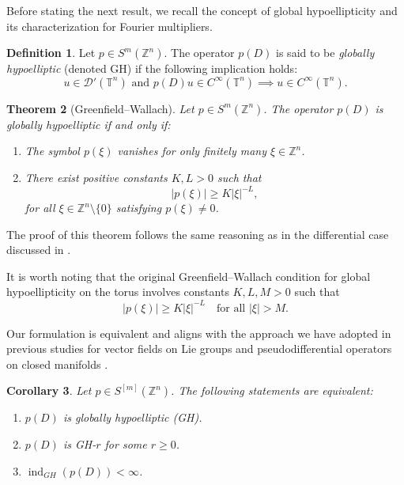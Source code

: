 \documentclass[11pt]{amsart}
\numberwithin{equation}{section}
\newtheorem{theorem}{Theorem}[section]
\newtheorem{corollary}[theorem]{Corollary}
\theoremstyle{definition}
\newtheorem{definition}[theorem]{Definition}
\begin{document}
	Before stating the next result, we recall the concept of global hypoellipticity and its characterization for Fourier multipliers.
	
	\begin{definition}
		Let \( p \in S^{m}(\mathbb{Z}^n) \). The operator \( p(D) \) is said to be \textit{globally hypoelliptic} (denoted GH) if the following implication holds:
		\[
		u \in \mathscr{D}'(\mathbb{T}^n) \text{ and } p(D)u \in C^\infty(\mathbb{T}^n) \implies u \in C^\infty(\mathbb{T}^n).
		\]
	\end{definition}
	
	\begin{theorem}[Greenfield–Wallach]\label{theoGW}
		Let \( p \in S^{m}(\mathbb{Z}^n) \). The operator \( p(D) \) is globally hypoelliptic if and only if:
		\begin{enumerate}
			\item[{\it (i)}] The symbol \( p(\xi) \) vanishes for only finitely many \( \xi \in \mathbb{Z}^n \).
			
			\item[{\it (ii)}] There exist positive constants \( K, L > 0 \) such that
			\begin{equation}\label{ineqGW}
				|p(\xi)| \geq K |\xi|^{-L},
			\end{equation}
			for all \( \xi \in \mathbb{Z}^n \setminus \{0\} \) satisfying \( p(\xi) \neq 0 \).
		\end{enumerate}
	\end{theorem}
	
	The proof of this theorem follows the same reasoning as in the differential case discussed in \cite{GW1972_pams}.
		
	It is worth noting that the original Greenfield–Wallach condition for global hypoellipticity on the torus involves constants \( K, L, M > 0 \) such that
	\[
	|p(\xi)| \geq K |\xi|^{-L} \quad \text{for all } |\xi| > M.
	\]
	
	Our formulation is equivalent and aligns with the approach we have adopted in previous studies for vector fields on Lie groups \cite{KMR2020_bsm, KMR2021_jfa, Kiri_Kow_Wagn_ToroEsfera} and pseudodifferential operators on closed manifolds \cite{AGK2018_jam, AK2019_jst}. 
	
	

	\begin{corollary}\label{coro_GH_equiv}
		Let \( p \in S^{[m]}(\mathbb{Z}^n) \). The following statements are equivalent:
		\begin{enumerate}
			\item[{\it (i)}] \( p(D) \) is globally hypoelliptic (GH).
			\item[{\it (ii)}] \( p(D) \) is GH-\( r \) for some \( r \geq 0 \).
            \item[{\it (iii)}] \( \operatorname{ind}_{GH}(p(D)) < \infty \).
		\end{enumerate}
	\end{corollary}
	
\end{document}
